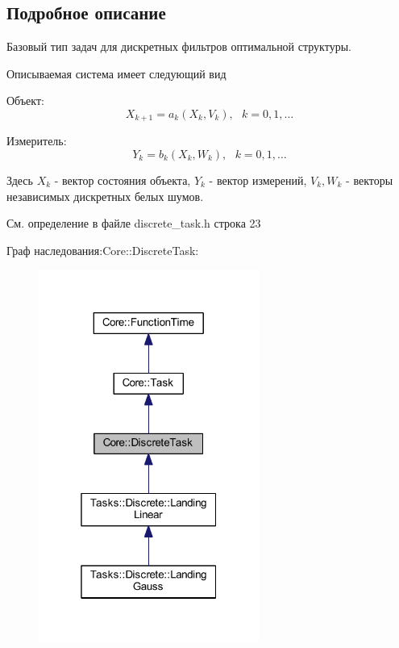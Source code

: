 \subsection{Подробное описание}
Базовый тип задач для дискретных фильтров оптимальной структуры. 

Описываемая система имеет следующий вид


\begin{DoxyItemize}
\item Объект\+: \[X_{k+1} = a_k(X_k, V_k),\ \ \ k = 0, 1, \ldots\]
\item Измеритель\+: \[Y_k = b_k(X_k, W_k),\ \ \ k = 0, 1, \ldots\]
\end{DoxyItemize}

Здесь $X_k$ -\/ вектор состояния объекта, $Y_k$ -\/ вектор измерений, $V_k, W_k$ -\/ векторы независимых дискретных белых шумов. 

См. определение в файле discrete\+\_\+task.\+h строка 23



Граф наследования\+:Core\+:\+:Discrete\+Task\+:
\nopagebreak
\begin{figure}[H]
\begin{center}
\leavevmode
\includegraphics[width=205pt]{class_core_1_1_discrete_task__inherit__graph}
\end{center}
\end{figure}


